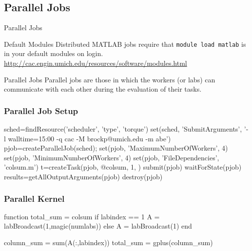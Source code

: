 \documentclass[handout]{beamer}
\begin{document}
   \subsection{Parallel Jobs}
   \begin{frame}{Parallel Jobs}
    \begin{block}{Default Modules}
     Distributed MATLAB jobs require that \texttt{module load matlab} is in your default modules on login. \\
\url{http://cac.engin.umich.edu/resources/software/modules.html}
    \end{block}
    \begin{block}{Parallel Jobs}
     Parallel jobs are those in which the workers (or labs) can communicate with each other during the evaluation of their tasks. 
    \end{block}
   \end{frame}
   
\begin{frame}[fragile]
\frametitle{Parallel Job Setup}
 \begin{semiverbatim}
sched=findResource('scheduler', 'type', 'torque')
set(sched, 'SubmitArguments', '-l walltime=15:00
             -q cac -M brockp@umich.edu -m abe')
pjob=createParallelJob(sched);
set(pjob, 'MaximumNumberOfWorkers', 4)
set(pjob, 'MinimumNumberOfWorkers', 4)
set(pjob, 'FileDependencies', {'colsum.m'})
t=createTask(pjob, @colsum, 1, {})
submit(pjob)
waitForState(pjob)
results=getAllOutputArguments(pjob)
destroy(pjob)
 \end{semiverbatim}
\end{frame}

\begin{frame}[fragile]
\frametitle{Parallel Kernel}
\begin{semiverbatim}
function total\_sum = colsum
if labindex == 1
  A = labBroadcast(1,magic(numlabs))
else
  A = labBroadcast(1)
end

column\_sum = sum(A(:,labindex))
total\_sum = gplus(column\_sum)
\end{semiverbatim}
\end{frame}
\end{document}
